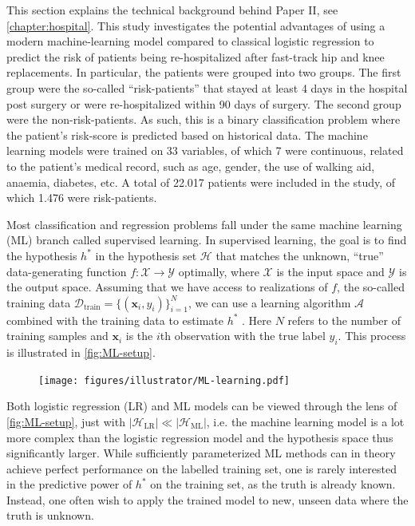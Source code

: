
This section explains the technical background behind Paper II, see \autoref{chapter:hospital}. This study investigates the potential advantages of using a modern machine-learning model compared to classical logistic regression to predict the risk of patients being re-hospitalized after fast-track hip and knee replacements. In particular, the patients were grouped into two groups. The first group were the so-called ``risk-patients'' that stayed at least 4 days in the hospital post surgery or were re-hospitalized within 90 days of surgery. The second group were the non-risk-patients. As such, this is a binary classification problem where the patient's risk-score is predicted based on historical data. The machine learning models were trained on 33 variables, of which 7 were continuous, related to the patient's medical record, such as age, gender, the use of walking aid, anaemia, diabetes, etc. A total of 22.017 patients were included in the study, of which 1.476 were risk-patients.


Most classification and regression problems fall under the same machine learning (ML) branch called supervised learning. In supervised learning, the goal is to find the hypothesis $h^*$ in the hypothesis set $\mathcal{H}$ that matches the unknown, ``true'' data-generating function $f: \mathcal{X} \rightarrow \mathcal{Y}$ optimally, where $\mathcal{X}$ is the input space and $\mathcal{Y}$ is the output space. Assuming that we have access to realizations of $f$, the so-called training data $\mathcal{D}_\mathrm{train} = \{(\mathbf{x}_i, y_i)\}_{i=1}^N$, we can use a learning algorithm $\mathcal{A}$ combined with the training data to estimate $h^*$ \autocite{abu-mostafaLearningData2012a}. Here $N$ refers to the number of training samples and $\mathbf{x}_i$ is the $i$th observation with the true label $y_i$. This process is illustrated in \autoref{fig:ML-setup}.

\begin{figure}[htbp]
    \centering
    \texttt{[image: figures/illustrator/ML-learning.pdf]}
\end{figure}

Both logistic regression (LR) and ML models can be viewed through the lens of \autoref{fig:ML-setup}, just with $|\mathcal{H}_\mathrm{LR}| \ll |\mathcal{H}_\mathrm{ML}|$, i.e. the machine learning model is a lot more complex than the logistic regression model and the hypothesis space thus significantly larger. While sufficiently parameterized ML methods can in theory achieve perfect performance on the labelled training set, one is rarely interested in the predictive power of $h^*$ on the training set, as the truth is already known. Instead, one often wish to apply the trained model to new, unseen data where the truth is unknown.


